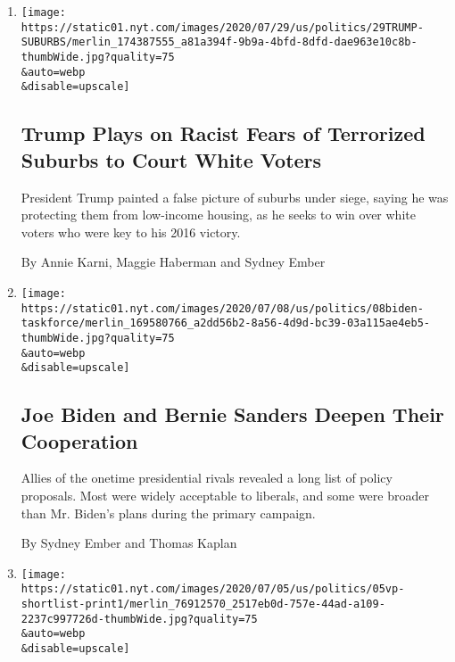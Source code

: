 \begin{enumerate}
\def\labelenumi{\arabic{enumi}.}
\item
  \href{/2020/07/29/us/politics/trump-suburbs-housing-white-voters.html}{}

  \texttt{[image: https://static01.nyt.com/images/2020/07/29/us/politics/29TRUMP-SUBURBS/merlin\_174387555\_a81a394f-9b9a-4bfd-8dfd-dae963e10c8b-thumbWide.jpg?quality=75\\\&auto=webp\\\&disable=upscale]}

  \hypertarget{trump-plays-on-racist-fears-of-terrorized-suburbs-to-court-white-voters}{%
  \subsection{Trump Plays on Racist Fears of Terrorized Suburbs to Court
  White
  Voters}\label{trump-plays-on-racist-fears-of-terrorized-suburbs-to-court-white-voters}}

  President Trump painted a false picture of suburbs under siege, saying
  he was protecting them from low-income housing, as he seeks to win
  over white voters who were key to his 2016 victory.

  By Annie Karni, Maggie Haberman and Sydney Ember
\item
  \href{/2020/07/08/us/politics/biden-bernie-sanders.html}{}

  \texttt{[image: https://static01.nyt.com/images/2020/07/08/us/politics/08biden-taskforce/merlin\_169580766\_a2dd56b2-8a56-4d9d-bc39-03a115ae4eb5-thumbWide.jpg?quality=75\\\&auto=webp\\\&disable=upscale]}

  \hypertarget{joe-biden-and-bernie-sanders-deepen-their-cooperation}{%
  \subsection{Joe Biden and Bernie Sanders Deepen Their
  Cooperation}\label{joe-biden-and-bernie-sanders-deepen-their-cooperation}}

  Allies of the onetime presidential rivals revealed a long list of
  policy proposals. Most were widely acceptable to liberals, and some
  were broader than Mr. Biden's plans during the primary campaign.

  By Sydney Ember and Thomas Kaplan
\item
  \href{/2020/07/04/us/politics/biden-vice-president-.html}{}

  \texttt{[image: https://static01.nyt.com/images/2020/07/05/us/politics/05vp-shortlist-print1/merlin\_76912570\_2517eb0d-757e-44ad-a109-2237c997726d-thumbWide.jpg?quality=75\\\&auto=webp\\\&disable=upscale]}


\end{enumerate}
